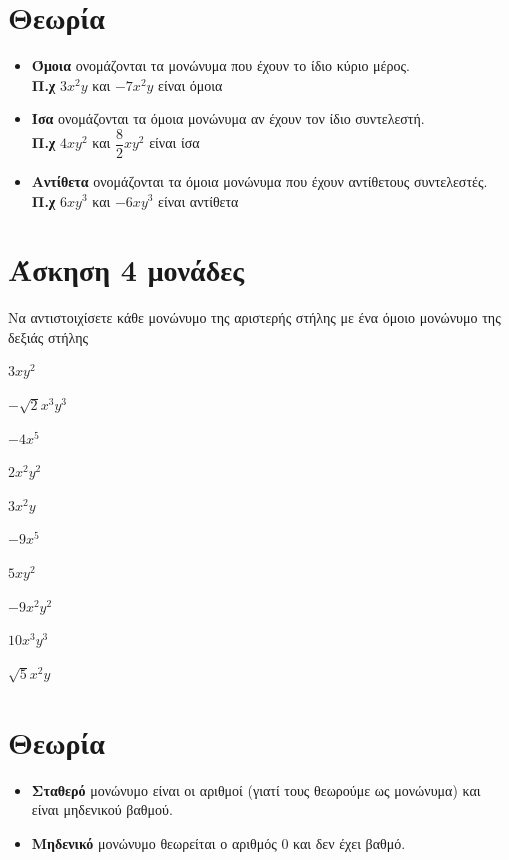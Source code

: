 \documentclass[a4paper,10pt]{report}
\begin{document}
\section*{Θεωρία  \hfill \small{}}
\begin{itemize}
 \item \textbf{Όμοια} ονομάζονται τα μονώνυμα που έχουν το ίδιο κύριο μέρος.\\
       \textbf{Π.χ} \quad $3x^{2}y$ και $-7x^{2}y$ είναι όμοια        
 \item \textbf{Ίσα} ονομάζονται τα όμοια μονώνυμα αν έχουν τον ίδιο συντελεστή.\\
       \textbf{Π.χ} \quad $4xy^{2}$  και $\dfrac{8}{2}xy^{2}$ είναι ίσα
 \item \textbf{Αντίθετα} ονομάζονται τα όμοια μονώνυμα που έχουν αντίθετους συντελεστές.\\
       \textbf{Π.χ} \quad $6xy^{3}$ και $-6xy^{3}$ είναι αντίθετα
\end{itemize}


\section*{Άσκηση 4  \hfill \small{ μονάδες}}
Να αντιστοιχίσετε κάθε μονώνυμο της αριστερής στήλης με ένα όμοιο μονώνυμο της δεξιάς στήλης
\begin{itemize}
\begin{multicols}{2}
 \item $3xy^{2}$
 \item $-\sqrt{2}x^{3}y^{3}$
 \item $-4x^{5}$
 \item $2x^{2}y^{2}$
 \item $3x^{2}y$
 \item $-9x^{5}$
 \item $5xy^{2}$
 \item $-9x^{2}y^{2}$
 \item $10x^{3}y^{3}$
 \item $\sqrt{5}x^{2}y$
\end{multicols}
\end{itemize}


\section*{Θεωρία  \hfill \small{}}
\begin{itemize}
 \item \textbf{Σταθερό} μονώνυμο είναι οι αριθμοί (γιατί τους θεωρούμε ως μονώνυμα) και είναι μηδενικού βαθμού.
 \item \textbf{Μηδενικό} μονώνυμο θεωρείται ο αριθμός $0$ και δεν έχει βαθμό.
\end{itemize}
\end{document}
